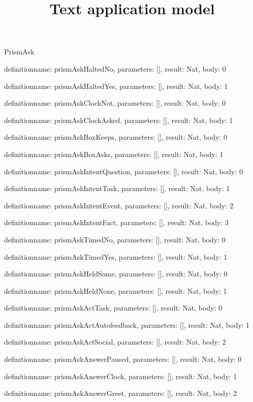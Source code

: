 \begin{lexlean}{PrismAsk}
\title{Text application model}
\begin{semanticmodule}
definition{name: prismAskHaltedNo, parameters: [], result: Nat, body: 0}

definition{name: prismAskHaltedYes, parameters: [], result: Nat, body: 1}

definition{name: prismAskClockNot, parameters: [], result: Nat, body: 0}

definition{name: prismAskClockAsked, parameters: [], result: Nat, body: 1}

definition{name: prismAskBoxKeeps, parameters: [], result: Nat, body: 0}

definition{name: prismAskBoxAsks, parameters: [], result: Nat, body: 1}

definition{name: prismAskIntentQuestion, parameters: [], result: Nat, body: 0}

definition{name: prismAskIntentTask, parameters: [], result: Nat, body: 1}

definition{name: prismAskIntentEvent, parameters: [], result: Nat, body: 2}

definition{name: prismAskIntentFact, parameters: [], result: Nat, body: 3}

definition{name: prismAskTimedNo, parameters: [], result: Nat, body: 0}

definition{name: prismAskTimedYes, parameters: [], result: Nat, body: 1}

definition{name: prismAskHeldSome, parameters: [], result: Nat, body: 0}

definition{name: prismAskHeldNone, parameters: [], result: Nat, body: 1}

definition{name: prismAskActTask, parameters: [], result: Nat, body: 0}

definition{name: prismAskActAutofeedback, parameters: [], result: Nat, body: 1}

definition{name: prismAskActSocial, parameters: [], result: Nat, body: 2}

definition{name: prismAskAnswerPaused, parameters: [], result: Nat, body: 0}

definition{name: prismAskAnswerClock, parameters: [], result: Nat, body: 1}

definition{name: prismAskAnswerGreet, parameters: [], result: Nat, body: 2}


\end{semanticmodule}
\end{lexlean}

